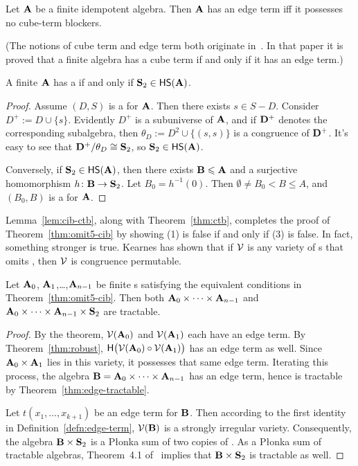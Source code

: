 \begin{theorem}
\label{thm:ctb}
Let $\mathbf{A}$ be a finite idempotent algebra. Then $\mathbf{A}$ has an edge term iff
it possesses no cube-term blockers.
\end{theorem}

(The notions of cube term and edge term both originate in~\cite{MR2563736}. In that paper it is proved that a finite algebra has a cube term if and only if it has an edge term.)

\begin{lemma}
\label{lem:cib-ctb}
  A finite \cib $\mathbf{A}$ has a \ctb if and only if $\mathbf S_2 \in \mathsf{H} \mathsf{S} (\mathbf{A})$.
\end{lemma}
\begin{proof}
  Assume $(D, S)$ is a \ctb for $\mathbf{A}$. Then there exists $s\in S-D$.  Consider
  $D^+ :=D \cup\{s\}$.  Evidently  $D^+$ is a subuniverse of $\mathbf{A}$, and 
  if $\mathbf{D}^+$ denotes the corresponding subalgebra, then 
  $\theta_D := D^2 \cup \{(s,s)\}$ is a congruence of $\mathbf{D}^+$. It's easy to see that
  $\mathbf{D}^+/\theta_D \cong \mathbf S_2$, so $\mathbf S_2 \in \mathsf{H} \mathsf{S} (\mathbf{A})$.
  
  Conversely, if $\mathbf S_2 \in \mathsf{H} \mathsf{S} (\mathbf{A})$, then there exists $\mathbf{B} \leqslant \mathbf{A}$ and
  a surjective homomorphism $h\colon \mathbf{B} \to \mathbf S_2$. Let $B_0=h^{-1}(0)$. Then $\emptyset \neq B_0 < B\leq A$, and $(B_0, B)$ is a \ctb for $\mathbf{A}$.  
  \end{proof}
  
Lemma~\ref{lem:cib-ctb}, along with Theorem~\ref{thm:ctb}, completes the proof of
Theorem~\ref{thm:omit5-cib} by showing (1) is false if and only if (3) is false. 
In fact, something stronger is true. Kearnes has shown that if $\mathcal{V}$ is any variety of {\cib}s that omits \slt, then $\mathcal{V}$ is congruence permutable. 

\begin{corollary}\label{cor:edge-prod}
Let $\mathbf{A}_0$, $\mathbf{A}_1$,\dots,$\mathbf{A}_{n-1}$ be finite {\cib}s satisfying the equivalent conditions in Theorem~\ref{thm:omit5-cib}. Then both $\mathbf{A}_0\times \cdots\times \mathbf{A}_{n-1}$ and $\mathbf{A}_0\times\cdots\times \mathbf{A}_{n-1} \times \mathbf S_2$ are tractable.
\end{corollary}

\begin{proof}
By the theorem, $\mathcal{V}(\mathbf{A}_0)$ and $\mathcal{V}(\mathbf{A}_1)$ each have an edge term. By Theorem~\ref{thm:robust}, $\mathsf{H}\bigl(\mathcal{V}(\mathbf{A}_0)\circ \mathcal{V}(\mathbf{A}_1)\bigr)$ has an edge term as well. Since $\mathbf{A}_0\times \mathbf{A}_1$ lies in this variety, it possesses that same edge term. Iterating this process, the algebra $\mathbf{B}=\mathbf{A}_0 \times \cdots \times \mathbf{A}_{n-1}$ has an edge term, hence is tractable by Theorem~\ref{thm:edge-tractable}.

Let $t(x_1,\dots,x_{k+1})$ be an edge term for $\mathbf{B}$. Then according to the first identity in Definition~\ref{defn:edge-term}, $\mathcal{V}(\mathbf{B})$ is a strongly irregular variety. Consequently, the algebra $\mathbf{B}\times \mathbf S_2$ is a P\l onka sum of two copies of \bB. As a P\l onka sum of tractable algebras, Theorem~4.1 of~\cite{MR3350338} implies that $\mathbf{B}\times \mathbf S_2$ is tractable as well.
\end{proof}

